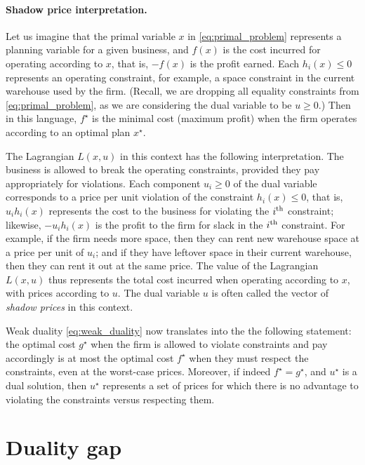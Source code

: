 \paragraph{Shadow price interpretation.}

Let us imagine that the primal variable $x$ in \eqref{eq:primal_problem}
represents a planning variable for a given business, and $f(x)$ is the cost 
incurred for operating according to $x$, that is, $-f(x)$ is the profit
earned. Each $h_i(x) \leq 0$ represents an operating constraint, for example, a
space constraint in the current warehouse used by the firm. (Recall, we are
dropping all equality constraints from \eqref{eq:primal_problem}, as we are  
considering the dual variable to be $u \geq 0$.)  Then in this language,
$f^\star$ is the minimal cost (maximum profit) when the firm operates according
to an optimal plan $x^\star$. 

The Lagrangian $L(x,u)$ in this context has the following interpretation. The
business is allowed to break the operating constraints, provided they pay
appropriately for violations. Each component $u_i \geq 0$ of the dual variable
corresponds to a price per unit violation of the constraint $h_i(x) \leq 0$,
that is, $u_i h_i(x)$ represents the cost to the business for violating the
$i^{\textnormal{th}}$ constraint; likewise, $-u_i h_i(x)$ is the profit to the firm for slack
in the $i^{\textnormal{th}}$ constraint. For example, if the firm needs more space, then they
can rent new warehouse space at a price per unit of $u_i$; and if they have
leftover space in their current warehouse, then they can rent it out at the same 
price. The value of the Lagrangian $L(x,u)$ thus represents the total cost
incurred when operating according to $x$, with prices according to $u$. The dual  
variable $u$ is often called the vector of \emph{shadow prices} in this
context. 

Weak duality \eqref{eq:weak_duality} now translates into the the following
statement: the optimal cost $g^\star$ when the firm is allowed to violate
constraints and pay accordingly is at most the optimal cost $f^\star$ when they
must respect the constraints, even at the worst-case prices. Moreover, if indeed
$f^\star = g^\star$, and $u^\star$ is a dual solution, then $u^\star$ represents
a set of prices for which there is no advantage to violating the constraints
versus respecting them.  

\section{Duality gap}

